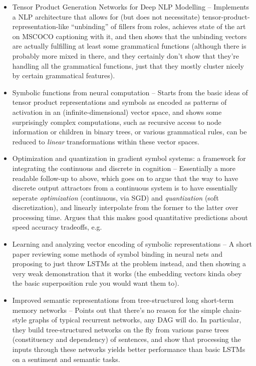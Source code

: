 \documentclass[10pt]{article}
\begin{document}
\begin{itemize}
\item Tensor Product Generation Networks for Deep NLP Modelling -- Implements a NLP architecture that allows for (but does not necessitate) tensor-product-representation-like ``unbinding'' of fillers from roles, achieves state of the art on MSCOCO captioning with it, and then shows that the unbinding vectors are actually fulfilling at least some grammatical functions (although there is probably more mixed in there, and they certainly don't show that they're handling all the grammatical functions, just that they mostly cluster nicely by certain grammatical features).
\item Symbolic functions from neural computation -- Starts from the basic ideas of tensor product representations and symbols as encoded as patterns of activation in an (infinite-dimensional) vector space, and shows some surprisingly complex computations, such as recursive access to node information or children in binary trees, or various grammatical rules, can be reduced to \emph{linear} transformations within these vector spaces.  
\item Optimization and quantization in gradient symbol systems: a framework for integrating the continuous and discrete in cognition -- Essentially a more readable follow-up to \citep{Smolensky2006} above, which goes on to argue that the way to have discrete output attractors from a continuous system is to have essentially seperate \emph{optimization} (continuous, via SGD) and \emph{quantization} (soft discretization), and linearly interpolate from the former to the latter over processing time. Argues that this makes good quantitative predictions about speed accuracy tradeoffs, e.g. \citep{Smolensky2014}
\item Learning and analyzing vector encoding of symbolic representations -- A short paper reviewing some methods of symbol binding in neural nets and proposing to just throw LSTMs at the problem instead, and then showing a very weak demonstration that it works (the embedding vectors kinda obey the basic superposition rule you would want them to). \citep{Fernandez2018} 
\item Improved semantic representations from tree-structured long short-term memory networks -- Points out that there's no reason for the simple chain-style graphs of typical recurrent networks, any DAG will do. In particular, they build tree-structured networks on the fly from various parse trees (constituency and dependency) of sentences, and show that processing the inputs through these networks yields better performance than basic LSTMs on a sentiment and semantic tasks. \citep{Tai2015} 

\end{itemize}
\end{document}
